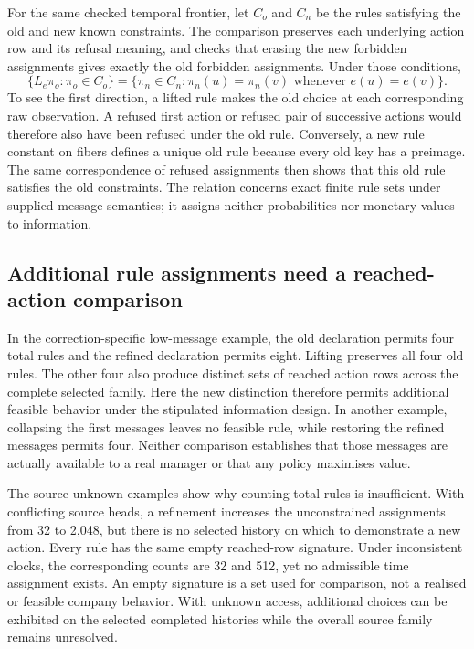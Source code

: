 For the same checked temporal frontier, let $C_o$ and $C_n$ be the rules satisfying the old and new known constraints. The comparison preserves each underlying action row and its refusal meaning, and checks that erasing the new forbidden assignments gives exactly the old forbidden assignments. Under those conditions,
\begin{equation}
 \{L_e\pi_o:\pi_o\in C_o\}
 =\{\pi_n\in C_n:\pi_n(u)=\pi_n(v)
       \text{ whenever }e(u)=e(v)\}.
 \label{eq:policy-refinement-lift}
\end{equation}
To see the first direction, a lifted rule makes the old choice at each corresponding raw observation. A refused first action or refused pair of successive actions would therefore also have been refused under the old rule. Conversely, a new rule constant on fibers defines a unique old rule because every old key has a preimage. The same correspondence of refused assignments then shows that this old rule satisfies the old constraints. The relation concerns exact finite rule sets under supplied message semantics; it assigns neither probabilities nor monetary values to information.

\subsection{Additional rule assignments need a reached-action comparison}

In the correction-specific low-message example, the old declaration permits four total rules and the refined declaration permits eight. Lifting preserves all four old rules. The other four also produce distinct sets of reached action rows across the complete selected family. Here the new distinction therefore permits additional feasible behavior under the stipulated information design. In another example, collapsing the first messages leaves no feasible rule, while restoring the refined messages permits four. Neither comparison establishes that those messages are actually available to a real manager or that any policy maximises value.

The source-unknown examples show why counting total rules is insufficient. With conflicting source heads, a refinement increases the unconstrained assignments from 32 to 2,048, but there is no selected history on which to demonstrate a new action. Every rule has the same empty reached-row signature. Under inconsistent clocks, the corresponding counts are 32 and 512, yet no admissible time assignment exists. An empty signature is a set used for comparison, not a realised or feasible company behavior. With unknown access, additional choices can be exhibited on the selected completed histories while the overall source family remains unresolved.

